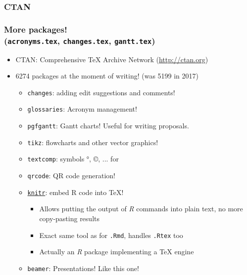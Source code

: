 \documentclass[xetex,colorlinks]{beamer} %
\begin{document}
  \subsubsection{CTAN}
  \begin{frame}
    \frametitle{More packages! \\ (\texttt{acronyms.tex}, \texttt{changes.tex}, \texttt{gantt.tex})}
    \begin{itemize}
     \item CTAN: Comprehensive \TeX{} Archive Network (\href{http://ctan.org}{http://ctan.org})
     \item 6274 packages at the moment of writing! (was 5199 in 2017)
      \begin{itemize}
      \item \texttt{changes}: adding edit suggestions and comments!
      \item \texttt{glossaries}: Acronym management!
      \item \texttt{pgfgantt}: Gantt charts! Useful for writing proposals.
      \item \texttt{tikz}: flowcharts and other vector graphics!
      \item \texttt{textcomp}: symbols °, ©, ... for 
      \item \texttt{qrcode}: QR code generation!
      \item \href{https://github.com/yihui/knitr-examples/blob/master/005-latex.Rtex}{\texttt{knitr}}: embed R code into \TeX{}!
      \begin{itemize}
	\item Allows putting the output of \textit{R} commands into plain text, no more copy-pasting results
	\item Exact same tool as for \texttt{.Rmd}, handles \texttt{.Rtex} too
	\item Actually an \textit{R} package implementing a \TeX{} engine
      \end{itemize}
      \item \texttt{beamer}: Presentations! Like this one!
      \end{itemize}
    \end{itemize}
  \end{frame}
\end{document}
